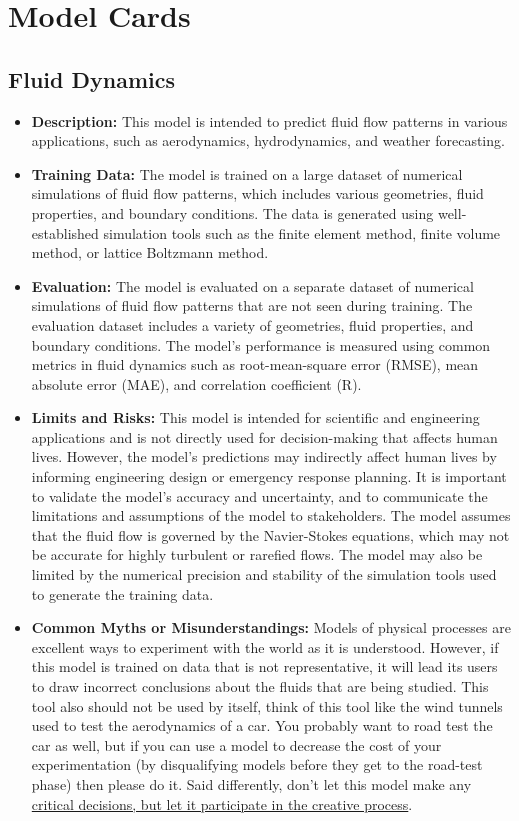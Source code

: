 \section{Model Cards}

\subsection{Fluid Dynamics}

\begin{itemize}
    \item \textbf{Description:} This model is intended to predict fluid flow patterns in various applications, such as aerodynamics, hydrodynamics, and weather forecasting.
    \item \textbf{Training Data:} The model is trained on a large dataset of numerical simulations of fluid flow patterns, which includes various geometries, fluid properties, and boundary conditions. The data is generated using well-established simulation tools such as the finite element method, finite volume method, or lattice Boltzmann method.
    \item \textbf{Evaluation:} The model is evaluated on a separate dataset of numerical simulations of fluid flow patterns that are not seen during training. The evaluation dataset includes a variety of geometries, fluid properties, and boundary conditions. The model's performance is measured using common metrics in fluid dynamics such as root-mean-square error (RMSE), mean absolute error (MAE), and correlation coefficient (R).
    \item \textbf{Limits and Risks:} This model is intended for scientific and engineering applications and is not directly used for decision-making that affects human lives. However, the model's predictions may indirectly affect human lives by informing engineering design or emergency response planning. It is important to validate the model's accuracy and uncertainty, and to communicate the limitations and assumptions of the model to stakeholders. The model assumes that the fluid flow is governed by the Navier-Stokes equations, which may not be accurate for highly turbulent or rarefied flows. The model may also be limited by the numerical precision and stability of the simulation tools used to generate the training data.
    \item \textbf{Common Myths or Misunderstandings:} Models of physical processes are excellent ways to experiment with the world as it is understood. However, if this model is trained on data that is not representative, it will lead its users to draw incorrect conclusions about the fluids that are being studied. This tool also should not be used by itself, think of this tool like the wind tunnels used to test the aerodynamics of a car. You probably want to road test the car as well, but if you can use a model to decrease the cost of your experimentation (by disqualifying models before they get to the road-test phase) then please do it. Said differently, don't let this model make any \hyperref[sec:creative]{critical decisions, but let it participate in the creative process}.

\end{itemize}
